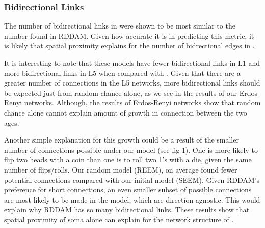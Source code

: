 \subsubsection{Bidirectional Links}
The number of bidirectional links in \ce were shown to be most similar to the number found in RDDAM.
Given how accurate it is in predicting this metric, it is likely that spatial proximity explains for the number of bidrectional edges in \ce.

It is interesting to note that these models have fewer bidirectional links in L1 and more bidirectional links in L5 when compared with \ce. 
Given that there are a greater number of connections in the L5 networks, more bidirectional links should be expected just from random chance alone, as we see in the results of our Erdos-Renyi networks. 
Although, the results of Erdos-Renyi networks show that random chance alone cannot explain amount of growth in connection between the two ages. 

Another simple explanation for this growth could be a result of the smaller number of connections possible under our model (see fig 1). 
One is more likely to flip two heads with a coin than one is to roll two 1's with a die, given the same number of flips/rolls. 
Our random model (REEM), on average found fewer potential connections compared with our initial model (SEEM). 
Given RDDAM's preference for short connections, an even smaller subset of possible connections are most likely to be made in the model, which are direction agnostic. 
This would explain why RDDAM has so many bidirectional links. 
These results show that spatial proximity of soma alone can explain for the network structure of \ce.